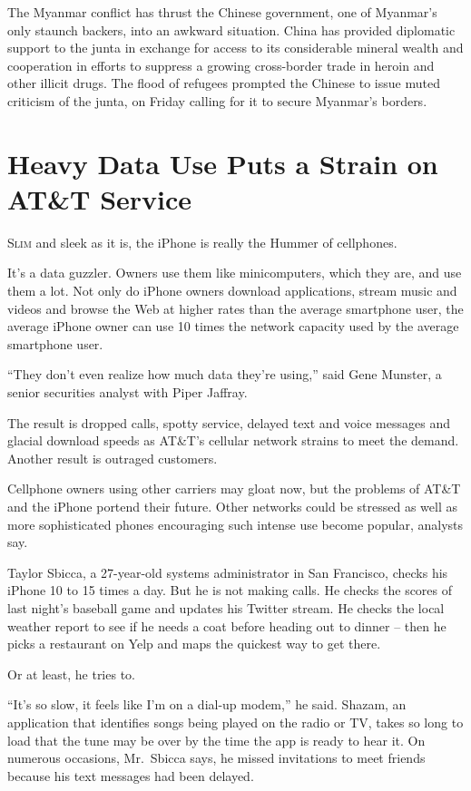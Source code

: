 ﻿\documentclass[12pt]{article}
\begin{document}
The Myanmar conflict has thrust the Chinese government, one of Myanmar's only staunch\cite{staunch}
backers, into an awkward situation. China has provided diplomatic support to the junta in exchange
for access to its considerable mineral wealth and cooperation in efforts to suppress a growing
cross-border trade in heroin and other illicit drugs. The flood of refugees prompted the Chinese to
issue muted criticism of the junta, on Friday calling for it to secure Myanmar's borders.

\section{Heavy Data Use Puts a Strain on AT\&T Service}

\lettrine{S}{lim} and sleek as it is, the iPhone is really the Hummer of cellphones.

It's a data guzzler. Owners use them like minicomputers, which they are, and use them a lot. Not
only do iPhone owners download applications, stream music and videos and browse the Web at higher
rates than the average smartphone user, the average iPhone owner can use 10 times the network
capacity used by the average smartphone user.

``They don't even realize how much data they're using,'' said Gene Munster, a senior securities
analyst with Piper Jaffray.

The result is dropped calls, spotty service, delayed text and voice messages and glacial download
speeds as AT\&T's cellular network strains to meet the demand. Another result is outraged customers.

Cellphone owners using other carriers may gloat now, but the problems of AT\&T and the iPhone
portend their future. Other networks could be stressed as well as more sophisticated phones
encouraging such intense use become popular, analysts say.

Taylor Sbicca, a 27-year-old systems administrator in San Francisco, checks his iPhone 10 to 15
times a day. But he is not making calls. He checks the scores of last night's baseball game and
updates his Twitter stream. He checks the local weather report to see if he needs a coat before
heading out to dinner -- then he picks a restaurant on Yelp and maps the quickest way to get there.

Or at least, he tries to.

``It's so slow, it feels like I'm on a dial-up modem,'' he said. Shazam, an application that
identifies songs being played on the radio or TV, takes so long to load that the tune may be over by
the time the app is ready to hear it. On numerous occasions, Mr.~Sbicca says, he missed invitations
to meet friends because his text messages had been delayed.
\end{document}
